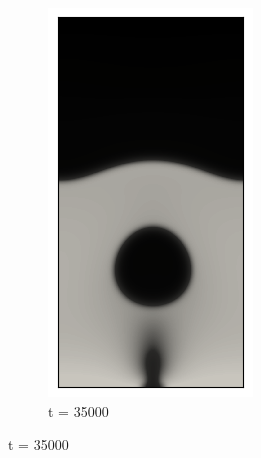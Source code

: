 \begin{figure}[h!]
\begin{subfigure}{0.25\textwidth}
		\includegraphics[width=\linewidth]{figs/cap4/bubble_35}
		\caption{t = 35000}
		\label{fig:6}
	\end{subfigure}
	

\end{figure}
